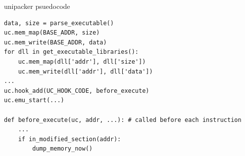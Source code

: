 \begin{frame}[fragile]{unipacker psuedocode}
\begin{Verbatim}[fontsize=\small]
data, size = parse_executable()
uc.mem_map(BASE_ADDR, size)
uc.mem_write(BASE_ADDR, data)
for dll in get_executable_libraries():
    uc.mem_map(dll['addr'], dll['size'])
    uc.mem_write(dll['addr'], dll['data'])
...
uc.hook_add(UC_HOOK_CODE, before_execute)
uc.emu_start(...)

def before_execute(uc, addr, ...): # called before each instruction
    ...
    if in_modified_section(addr):
        dump_memory_now()
\end{Verbatim}
\end{frame}

